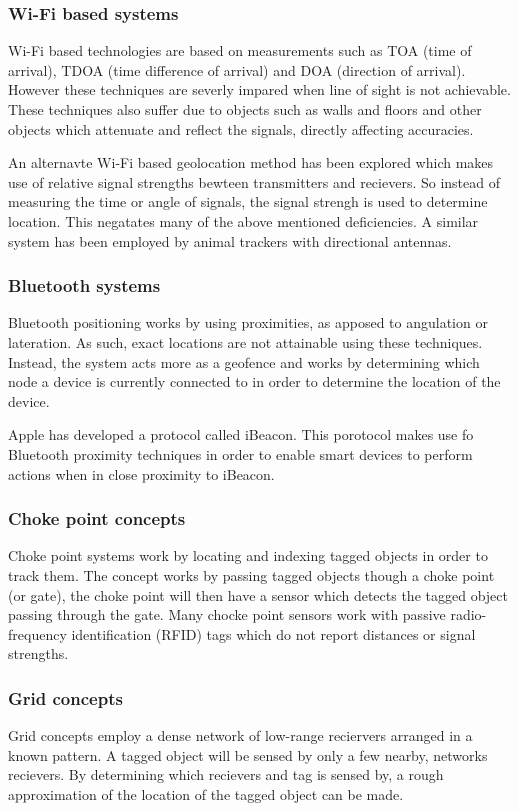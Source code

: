 \subsubsection{Wi-Fi based systems}
Wi-Fi based technologies are based on measurements such as TOA (time of arrival), TDOA (time difference of arrival) and DOA (direction of arrival). However these techniques are severly impared when line of sight is not achievable. These techniques also suffer due to objects such as walls and floors and other objects which attenuate and reflect the signals, directly affecting accuracies.

An alternavte Wi-Fi based geolocation method has been explored which makes use of relative signal strengths bewteen transmitters and recievers. So instead of measuring the time or angle of signals, the signal strengh is used to determine location. This negatates many of the above mentioned deficiencies. A similar system has been employed by animal trackers with directional antennas.
\cite{yongguang_chen_signal_2002}

\subsubsection{Bluetooth systems}
Bluetooth positioning works by using proximities, as apposed to angulation or lateration. As such, exact locations are not attainable using these techniques. Instead, the system acts more as a geofence and works by determining which node a device is currently connected to in order to determine the location of the device.

Apple has developed a protocol called iBeacon. This porotocol makes use fo Bluetooth proximity techniques in order to enable smart devices to perform actions when in close proximity to iBeacon.
\cite{_everything_????}

\subsubsection{Choke point concepts}
Choke point systems work by locating and indexing tagged objects in order to track them. The concept works by passing tagged objects though a choke point (or gate), the choke point will then have a sensor which detects the tagged object passing through the gate. Many chocke point sensors work with passive radio-frequency identification (RFID) tags which do not report distances or signal strengths.
\cite{reza_investigation_2008}

\subsubsection{Grid concepts}
Grid concepts employ a dense network of low-range reciervers arranged in a known pattern. A tagged object will be sensed by only a few nearby, networks recievers. By determining which recievers and tag is sensed by, a rough approximation of the location of the tagged object can be made.

